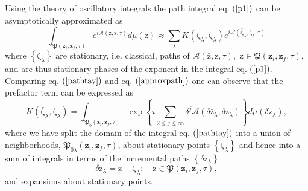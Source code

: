 \documentclass[aps,preprint]{revtex4}%
\begin{document}
Using the theory of oscillatory integrals the path integral eq. $\left(
\ref{p1}\right)  $ can be asymptotically approximated \cite{de Witt} as
\begin{equation}
\int_{\mathfrak{P}\left(  \mathbf{z}_{i},\mathbf{z}_{f},\tau\right)
}e^{i\mathcal{A}\left(  \mathrm{\bar{z}},\mathrm{z}\mathbf{,}\tau\right)
}d\mu\left(  \mathrm{z}\right)  \approx\sum_{\lambda}K\left(  \mathrm{\bar
{\zeta}}_{\lambda}\mathbf{,}\mathrm{\zeta}_{\lambda}\right)  e^{i\mathcal{A}%
\left(  \mathrm{\bar{\zeta}}_{\lambda}\mathbf{,}\mathrm{\zeta}_{\lambda
}\mathbf{,}\tau\right)  } \label{approxpath}%
\end{equation}
where $\left\{  \mathrm{\zeta}_{\lambda}\right\}  $ are stationary, i.e.
classical, paths of $\mathcal{A}\left(  \mathrm{\bar{z}},\mathrm{z}%
\mathbf{,}\tau\right)  ,$ $\mathrm{z\in}\mathfrak{P}\left(  \mathbf{z}%
_{i},\mathbf{z}_{f},\tau\right)  ,$ and are thus stationary phases of the
exponent in the integral eq. $\left(  \ref{p1}\right)  $. Comparing eq.
$\left(  \ref{pathtay}\right)  $ and eq. $\left(  \ref{approxpath}\right)  $
one can observe that the prefactor term can be expressed as
\begin{equation}
K\left(  \mathrm{\bar{\zeta}}_{\lambda}\mathbf{,}\mathrm{\zeta}_{\lambda
}\right)  =\int_{\mathfrak{P}_{0}\left(  \mathbf{z}_{i},\mathbf{z}_{f}%
,\tau\right)  }\exp\left\{  i\sum\limits_{2\leq j\leq\infty}\delta
^{j}\mathcal{A}\left(  \delta\mathrm{\bar{z}}_{\lambda},\delta\mathrm{z}%
_{\lambda}\right)  \right\}  d\mu\left(  \delta\mathrm{z}_{\lambda}\right)  ,
\label{kexp}%
\end{equation}
where we have split the domain of the integral eq. $\left(  \ref{pathtay}%
\right)  $ into a union of neighborhoods, $\mathfrak{P}_{0\lambda}\left(
\mathbf{z}_{i},\mathbf{z}_{f},\tau\right)  $, about stationary points
$\left\{  \mathrm{\zeta}_{\lambda}\right\}  $ and hence into a sum of
integrals in terms of the incremental paths $\left\{  \delta\mathrm{z}%
_{\lambda}\right\}  $%
\begin{equation}
\delta\mathrm{z}_{\lambda}=\mathrm{z}-\mathrm{\zeta}_{\lambda};\quad
\mathrm{z}\in\mathfrak{P}\left(  \mathbf{z}_{i},\mathbf{z}_{f},\tau\right)  ,
\end{equation}
and expansions about stationary points.
\end{document}
